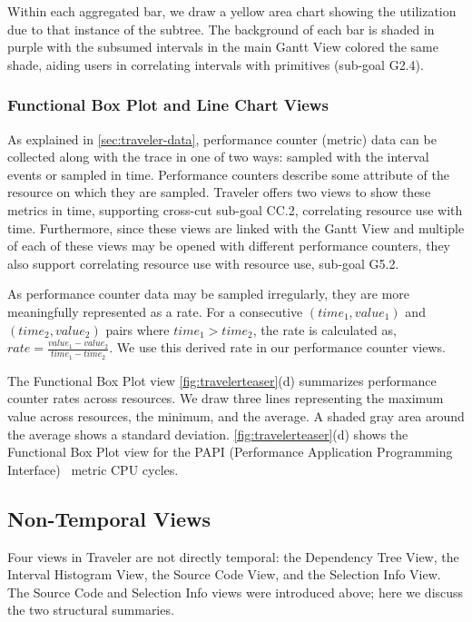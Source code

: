 \begin{refsection}
Within each aggregated bar, we draw a yellow area chart showing the utilization due to that instance of the subtree. The background of each bar is shaded in purple with the subsumed intervals in the main Gantt View colored the same shade, aiding users in correlating intervals with primitives (sub-goal G2.4).

\subsubsection{Functional Box Plot and Line Chart Views} 

As explained in \autoref{sec:traveler-data}, performance counter (metric) data can be collected along with the trace in one of two ways: sampled with the interval events or sampled in time. Performance counters describe some attribute of the resource on which they are sampled. Traveler offers two views to show these metrics in time, supporting cross-cut sub-goal CC.2, correlating resource use with time. Furthermore, since these views are linked with the Gantt View and multiple of each of these views may be opened with different performance counters, they also support correlating resource use with resource use, sub-goal G5.2.

As performance counter data may be sampled irregularly, they are more meaningfully represented as a rate. For a consecutive $(time_1, value_1)$ and $(time_2, value_2)$ pairs where $time_1 > time_2$, the rate is calculated as, $rate=\frac{value_1-value_2}{time_1-time_2}$. We use this derived rate in our performance counter views.

The Functional Box Plot view \autoref{fig:travelerteaser}(d) summarizes performance counter rates across resources. We draw three lines representing the maximum value across resources, the minimum, and the average. A shaded gray area around the average shows a standard deviation. \autoref{fig:travelerteaser}(d) shows the Functional Box Plot view for the  PAPI (Performance Application Programming Interface)~\cite{browne2000portable} metric CPU cycles. 

\subsection{Non-Temporal Views}
\label{subsec:non_temporal}

Four views in Traveler are not directly temporal: the Dependency Tree View, the Interval Histogram View, the Source Code View, and the Selection Info View. The Source Code and Selection Info views were introduced above; here we discuss the two structural summaries.


\end{refsection}
